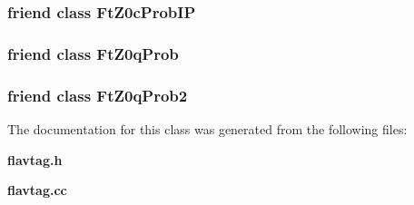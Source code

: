 \subsubsection[{Ft\-Z0c\-Prob\-I\-P}]{\setlength{\rightskip}{0pt plus 5cm}friend class {\bf Ft\-Z0c\-Prob\-I\-P}\hspace{0.3cm}{\ttfamily [friend]}}\label{classlcfiplus_1_1FtIPProbHolder_a843d4e920977d7eadc0c925754347867}
\subsubsection[{Ft\-Z0q\-Prob}]{\setlength{\rightskip}{0pt plus 5cm}friend class {\bf Ft\-Z0q\-Prob}\hspace{0.3cm}{\ttfamily [friend]}}\label{classlcfiplus_1_1FtIPProbHolder_a611b901fcff025fcb9ba65d33a8af535}
\subsubsection[{Ft\-Z0q\-Prob2}]{\setlength{\rightskip}{0pt plus 5cm}friend class {\bf Ft\-Z0q\-Prob2}\hspace{0.3cm}{\ttfamily [friend]}}\label{classlcfiplus_1_1FtIPProbHolder_a09544ba11cbad27359547b8644e7448d}


The documentation for this class was generated from the following files\-:\begin{DoxyCompactItemize}
\item 
{\bf flavtag.\-h}\item 
{\bf flavtag.\-cc}\end{DoxyCompactItemize}
